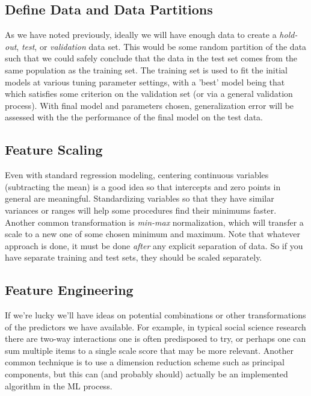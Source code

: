 \documentclass[english,nohyper,titlepage]{tufte-handout}\usepackage{knitr}
\begin{document}
\subsection{Define Data and Data Partitions}
As we have noted previously, ideally we will have enough data to create a \emph{hold-out}, \emph{test}, or \emph{validation} data set. This would be some random partition of the data such that we could safely conclude that the data in the test set comes from the same population as the training set. The training set is used to fit the initial models at various tuning parameter settings, with a 'best' model being that which satisfies some criterion on the validation set (or via a general validation process).  With final model and parameters chosen, generalization error will be assessed with the the performance of the final model on the test data.

\subsection{Feature Scaling}
Even with standard regression modeling, centering continuous variables (subtracting the mean) is a good idea so that intercepts and zero points in general are meaningful. Standardizing variables so that they have similar variances or ranges will help some procedures find their minimums faster.  Another common transformation is \emph{min-max} normalization, which will transfer a scale to a new one of some chosen minimum and maximum.  Note that whatever approach is done, it must be done \emph{after} any explicit separation of data.  So if you have separate training and test sets, they should be scaled separately.

\subsection{Feature Engineering}
If we're lucky we'll have ideas on potential combinations or other transformations of the predictors we have available.  For example, in typical social science research there are two-way interactions one is often predisposed to try, or perhaps one can sum multiple items to a single scale score that may be more relevant.  Another common technique is to use a dimension reduction scheme such as principal components, but this can (and probably should) actually be an implemented algorithm in the ML process.
\end{document}
